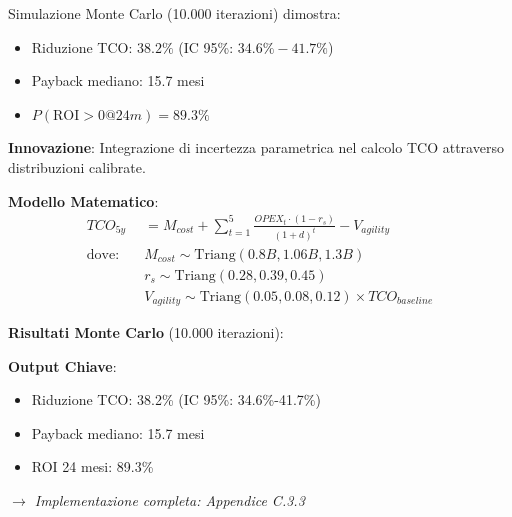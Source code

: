 \begin{tcolorbox}[colback=yellow!10!white,colframe=orange!75!black,title=Risultato Chiave]
Simulazione Monte Carlo (10.000 iterazioni) dimostra:
\begin{itemize}
\item Riduzione TCO: $38.2\%$ (IC 95\%: $34.6\%-41.7\%$)
\item Payback mediano: 15.7 mesi
\item $P(\text{ROI}>0 @ 24m) = 89.3\%$
\end{itemize}
\end{tcolorbox}
\begin{tcolorbox}[
    colback=orange!5!white,
    colframe=orange!65!black,
    title={\textbf{Innovation Box 3.1:} Modello TCO Stocastico per Cloud Migration},
    fonttitle=\bfseries,
    boxrule=1.5pt,
    arc=2mm,
    breakable
]
\textbf{Innovazione}: Integrazione di incertezza parametrica nel calcolo TCO attraverso distribuzioni calibrate.

\vspace{0.3cm}
\textbf{Modello Matematico}:
\begin{align*}
TCO_{5y} &= M_{cost} + \sum_{t=1}^{5} \frac{OPEX_t \cdot (1-r_s)}{(1+d)^t} - V_{agility} \\
\text{dove:} \quad & M_{cost} \sim \text{Triang}(0.8B, 1.06B, 1.3B) \\
& r_s \sim \text{Triang}(0.28, 0.39, 0.45) \\
& V_{agility} \sim \text{Triang}(0.05, 0.08, 0.12) \times TCO_{baseline}
\end{align*}

\vspace{0.3cm}
\textbf{Risultati Monte Carlo} (10.000 iterazioni):
\begin{center}
\end{center}

\textbf{Output Chiave}:
\begin{itemize}[topsep=0pt,itemsep=2pt]
    \item Riduzione TCO: 38.2\% (IC 95\%: 34.6\%-41.7\%)
    \item Payback mediano: 15.7 mesi
    \item ROI 24 mesi: 89.3\%
\end{itemize}

\textit{$\rightarrow$ Implementazione completa: Appendice C.3.3}
\end{tcolorbox}


